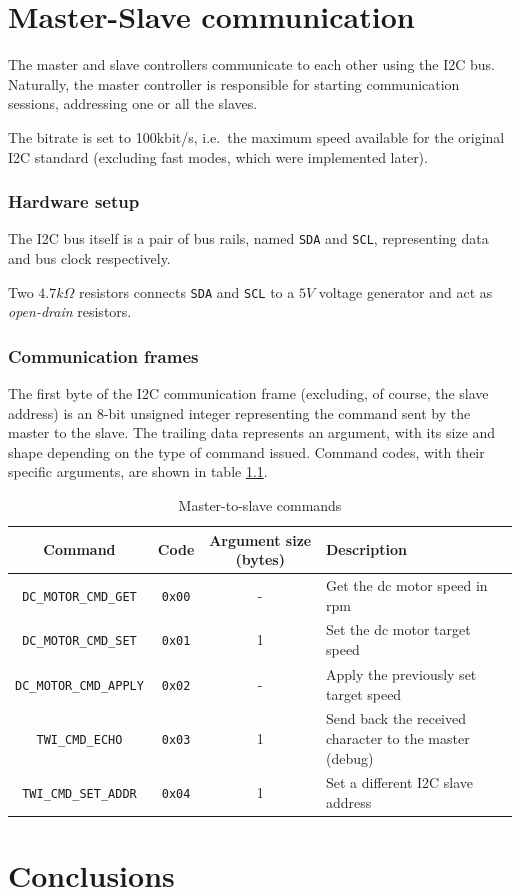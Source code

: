 \documentclass[binding=0.6cm,Lau]{sapthesis}
\begin{document}
\chapter{Master-Slave communication}
\label{ch:master-slave-comm}
The master and slave controllers communicate to each other using the I2C
bus. Naturally, the master controller is responsible for starting communication
sessions, addressing one or all the slaves.

The bitrate is set to 100kbit/s, i.e.\ the maximum speed available for the
original I2C standard\cite{i2c-ref} (excluding fast modes, which were
implemented later).

\subsection{Hardware setup}
The I2C bus itself is a pair of bus rails, named \texttt{SDA} and \texttt{SCL},
representing data and bus clock respectively.

Two $4.7 k\Omega$ resistors connects \texttt{SDA} and \texttt{SCL} to a $5V$
voltage generator and act as \emph{open-drain} resistors.

\subsection{Communication frames}
The first byte of the I2C communication frame (excluding, of course, the slave
address) is an 8-bit unsigned integer representing the command sent by the
master to the slave. The trailing data represents an argument, with its size
and shape depending on the type of command issued. Command codes, with their
specific arguments, are shown in table \ref{tab:i2c-commands}.

\begin{table}[bh]
  \begin{tabularx}{\textwidth}{c c c X}
    \toprule
    Command & Code & Argument size (bytes) & Description \\
    \midrule
      \texttt{DC\_MOTOR\_CMD\_GET}   & \texttt{0x00} & - & Get the dc motor speed in rpm \\
      \texttt{DC\_MOTOR\_CMD\_SET}   & \texttt{0x01} & 1 & Set the dc motor target speed \\
      \texttt{DC\_MOTOR\_CMD\_APPLY} & \texttt{0x02} & - & Apply the previously set target speed \\
      \texttt{TWI\_CMD\_ECHO}        & \texttt{0x03} & 1 & Send back the received character to the master (debug)\\
      \texttt{TWI\_CMD\_SET\_ADDR}   & \texttt{0x04} & 1 & Set a different I2C slave address \\
    \bottomrule
  \end{tabularx}
  \caption{Master-to-slave commands}
  \label{tab:i2c-commands}
\end{table}


\chapter{Conclusions}
\label{ch:conclusions}


\backmatter
\cleardoublepage
{} %



\end{document}
